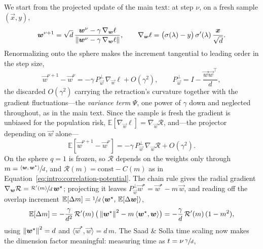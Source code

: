 We start from the projected update of the main text: at step \(\nu\), on a fresh sample \((\vec{x}, y)\),
\begin{equation} \label{app:intro:eq:proj-update}
    {\boldsymbol{w}}^{\nu+1} = \sqrt{d}\,\frac{{\boldsymbol{w}}^{\nu} - \gamma\,\nabla_{{\boldsymbol{w}}}\ell}{\left\lVert {\boldsymbol{w}}^{\nu} - \gamma\,\nabla_{{\boldsymbol{w}}}\ell\right\rVert}, \qquad \nabla_{{\boldsymbol{w}}}\ell = \big(\sigma(\lambda) - y\big)\,\sigma'(\lambda)\,\frac{{\boldsymbol{x}}}{\sqrt{d}}.
\end{equation}
Renormalizing onto the sphere makes the increment tangential to leading order in the step size,
\begin{equation} \label{app:intro:eq:tangent-step}
    \vec{w}^{\nu+1} - \vec{w}^{\nu} = -\gamma\,P_{\vec{w}}^{\perp}\,\nabla_{\vec{w}}\ell + O(\gamma^2), \qquad P_{\vec{w}}^{\perp} = I - \frac{\vec{w}\vec{w}^\top}{d},
\end{equation}
the discarded \(O(\gamma^2)\) carrying the retraction's curvature together with the gradient fluctuations---the \emph{variance term} \(\Psi\), one power of \(\gamma\) down and neglected throughout, as in the main text. Since the sample is fresh the gradient is unbiased for the population risk, \(\mathbb{E}[\nabla_{\vec{w}}\ell] = \nabla_{\vec{w}}\mathcal{R}\), and---the projector depending on \(\vec{w}\) alone---
\begin{equation}
    \mathbb{E}[\vec{w}^{\nu+1} - \vec{w}^{\nu}] = -\gamma\,P_{\vec{w}}^{\perp}\,\nabla_{\vec{w}}\mathcal{R} + O(\gamma^2).
\end{equation}
On the sphere \(q = 1\) is frozen, so \(\mathcal{R}\) depends on the weights only through \(m = \sfrac{\langle {\boldsymbol{w}}, {\boldsymbol{w}}^\star\rangle}{d}\), and \(\mathcal{R}(m) = \mathrm{const} - C(m)\) as in Equation~\eqref{eq:intro:correlation-potential}. The chain rule gives the radial gradient \(\nabla_{{\boldsymbol{w}}}\mathcal{R} = \sfrac{\mathcal{R}'(m)}{d}\,{\boldsymbol{w}}^\star\); projecting it leaves \(P_{\vec{w}}^{\perp}\vec{w}^\star = \vec{w}^\star - m\,\vec{w}\), and reading off the overlap increment \(\mathbb{E}[\Delta m] = \sfrac1d\,\langle {\boldsymbol{w}}^\star,\,\mathbb{E}[\Delta {\boldsymbol{w}}]\rangle\),
\begin{equation}
    \mathbb{E}[\Delta m] = -\frac{\gamma}{d^2}\,\mathcal{R}'(m)\,\big(\left\lVert {\boldsymbol{w}}^\star\right\rVert^2 - m\,\langle {\boldsymbol{w}}^\star, {\boldsymbol{w}}\rangle\big) = -\frac{\gamma}{d}\,\mathcal{R}'(m)\,(1 - m^2),
\end{equation}
using \(\left\lVert {\boldsymbol{w}}^\star\right\rVert^2 = d\) and \(\langle \vec{w}^\star, \vec{w}\rangle = d\,m\). The Saad \& Solla time scaling now makes the dimension factor meaningful: measuring time as \(t = \nu\,\sfrac{\gamma}{d}\),
